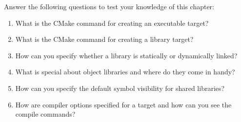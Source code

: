 Answer the following questions to test your knowledge of this chapter:

\begin{enumerate}
\item 
What is the CMake command for creating an executable target?
	
\item 
What is the CMake command for creating a library target?

\item 
How can you specify whether a library is statically or dynamically linked?

\item 
What is special about object libraries and where do they come in handy?

\item 
How can you specify the default symbol visibility for shared libraries?

\item 
How are compiler options specified for a target and how can you see the compile commands?
\end{enumerate}